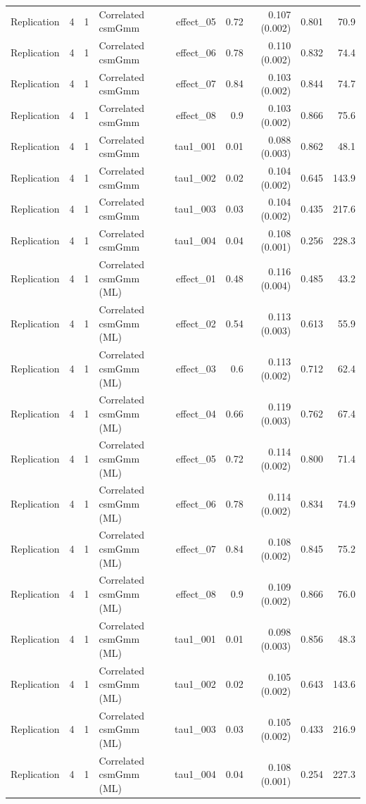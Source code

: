 \begin{longtable}{lcclrrrrr}
Replication & 4 & 1 & Correlated csmGmm & effect\_05 & 0.72 & 0.107 (0.002) & 0.801 & 70.9\\
Replication & 4 & 1 & Correlated csmGmm & effect\_06 & 0.78 & 0.110 (0.002) & 0.832 & 74.4\\
Replication & 4 & 1 & Correlated csmGmm & effect\_07 & 0.84 & 0.103 (0.002) & 0.844 & 74.7\\
Replication & 4 & 1 & Correlated csmGmm & effect\_08 & 0.9 & 0.103 (0.002) & 0.866 & 75.6\\
Replication & 4 & 1 & Correlated csmGmm & tau1\_001 & 0.01 & 0.088 (0.003) & 0.862 & 48.1\\
Replication & 4 & 1 & Correlated csmGmm & tau1\_002 & 0.02 & 0.104 (0.002) & 0.645 & 143.9\\
Replication & 4 & 1 & Correlated csmGmm & tau1\_003 & 0.03 & 0.104 (0.002) & 0.435 & 217.6\\
Replication & 4 & 1 & Correlated csmGmm & tau1\_004 & 0.04 & 0.108 (0.001) & 0.256 & 228.3\\
Replication & 4 & 1 & Correlated csmGmm (ML) & effect\_01 & 0.48 & 0.116 (0.004) & 0.485 & 43.2\\
Replication & 4 & 1 & Correlated csmGmm (ML) & effect\_02 & 0.54 & 0.113 (0.003) & 0.613 & 55.9\\
Replication & 4 & 1 & Correlated csmGmm (ML) & effect\_03 & 0.6 & 0.113 (0.002) & 0.712 & 62.4\\
Replication & 4 & 1 & Correlated csmGmm (ML) & effect\_04 & 0.66 & 0.119 (0.003) & 0.762 & 67.4\\
Replication & 4 & 1 & Correlated csmGmm (ML) & effect\_05 & 0.72 & 0.114 (0.002) & 0.800 & 71.4\\
Replication & 4 & 1 & Correlated csmGmm (ML) & effect\_06 & 0.78 & 0.114 (0.002) & 0.834 & 74.9\\
Replication & 4 & 1 & Correlated csmGmm (ML) & effect\_07 & 0.84 & 0.108 (0.002) & 0.845 & 75.2\\
Replication & 4 & 1 & Correlated csmGmm (ML) & effect\_08 & 0.9 & 0.109 (0.002) & 0.866 & 76.0\\
Replication & 4 & 1 & Correlated csmGmm (ML) & tau1\_001 & 0.01 & 0.098 (0.003) & 0.856 & 48.3\\
Replication & 4 & 1 & Correlated csmGmm (ML) & tau1\_002 & 0.02 & 0.105 (0.002) & 0.643 & 143.6\\
Replication & 4 & 1 & Correlated csmGmm (ML) & tau1\_003 & 0.03 & 0.105 (0.002) & 0.433 & 216.9\\
Replication & 4 & 1 & Correlated csmGmm (ML) & tau1\_004 & 0.04 & 0.108 (0.001) & 0.254 & 227.3\\

\end{longtable}
